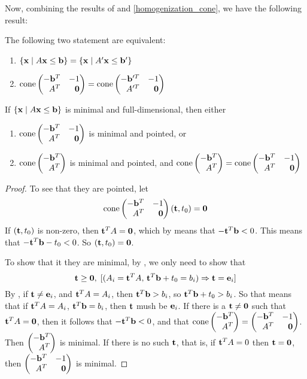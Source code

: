 Now, combining the results of  and \cref{homogenization_cone}, we have the following result:

\begin{Prop}\label{dual_homogenization_cone}
	The following two statement are equivalent:
	\begin{enumerate}
		\item $\left\{\mathbf{x}\;|\; A\mathbf{x}\leq \mathbf{b}\right\} = \left\{\mathbf{x}\;|\; A'\mathbf{x}\leq \mathbf{b}'\right\}$
		\item $\cone \pmb -\b^T & -1 \\ A^T & \0 \pme = \cone \pmb -\b'^T & -1 \\ A'^T & \0 \pme$
	\end{enumerate}
\end{Prop}

\begin{Prop}\label{dual_cone_min}
	If $\left\{\mathbf{x}\;|\; A\mathbf{x}\leq \mathbf{b}\right\}$ is minimal and full-dimensional, then either 
  \begin{enumerate}
    \item $\cone \pmb -\b^T & -1 \\ A^T & \0 \pme$ is minimal and pointed, or
    \item $\cone \pmb -\b^T \\ A^T \pme$ is minimal and pointed, and $\cone\pmb -\b^T \\ A^T \pme = \cone \pmb -\b^T & -1 \\ A^T & \0 \pme$
  \end{enumerate}
\end{Prop}

\begin{proof}
	To see that they are pointed, let
	\[\cone \pmb -\b^T & -1 \\ A^T & \0 \pme (\t,t_0) = \0\]
	If $(\mathbf{t},t_0)$ is non-zero, then $\mathbf{t}^T A = \mathbf{0}$, which by  means that $-\mathbf{t}^T \mathbf{b} < 0$.  This means that $-\mathbf{t}^T\mathbf{b} -t_0 < 0$.  So $(\mathbf{t},t_0) = \mathbf{0}$.  
  
  To show that it they are minimal, by , we only need to show that
	\[ \mathbf{t}\geq\mathbf{0},\; [(A_i=\mathbf{t}^T A,\,\mathbf{t}^T \mathbf{b} + t_0 = b_i) \Rightarrow \mathbf{t}=\mathbf{e}_i] \]
	By , if $\mathbf{t}\neq\mathbf{e}_i$, and $\mathbf{t}^T A = A_i$, then $\mathbf{t}^T \mathbf{b} > b_i$, so $\mathbf{t}^T\mathbf{b} + t_0 > b_i$.  So that means that if $\mathbf{t}^T A = A_i$, $\mathbf{t}^T\mathbf{b} = b_i$, then $\mathbf{t}$ mush be $\mathbf{e}_i$.  If there is a $\mathbf{t}\neq\mathbf{0}$ such that $\mathbf{t}^T A = \mathbf{0}$, then it follows that $-\mathbf{t}^T \mathbf{b} < 0$, and that $\cone\pmb -\b^T \\ A^T \pme = \pmb -\b^T & -1 \\ A^T & \0 \pme$.  Then $\pmb -\b^T \\ A^T \pme$ is minimal.  If there is no such $\mathbf{t}$, that is, if $\mathbf{t}^T A = 0$ then $\mathbf{t}=\mathbf{0}$, then $\pmb -\b^T & -1 \\ A^T & \0 \pme$ is minimal.
\end{proof}

